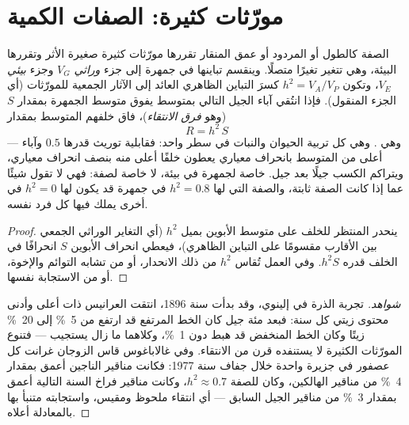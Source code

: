 \section{مورّثات كثيرة: الصفات الكمية}

\begin{theorem}\label{thm:b2:population-genetics:heritability}
الصفة كالطول أو المردود أو عمق المنقار تقررها مورّثات
كثيرة صغيرة الأثر وتقررها البيئة، وهي تتغير
تغيرًا متصلًا. وينقسم تباينها في جمهرة إلى جزء
\emph{وراثي} $V_G$ وجزء \emph{بيئي} $V_E$، وتكون
\emph{} $h^{2} = V_A/V_P$ كسرَ التباين
الظاهري العائد إلى الآثار الجمعية للمورّثات (أي الجزء
المنقول). فإذا انتُقي آباء الجيل التالي
بمتوسط يفوق متوسط الجمهرة بمقدار $S$ (وهو
\emph{فرق الانتقاء})، فاق خلفهم المتوسط بمقدار
\[
R = h^{2}\,S
\]
--- وهي \emph{}. وهي كل تربية الحيوان
والنبات في سطر واحد: فقابلية توريث قدرها $0.5$ وآباء أعلى من
المتوسط بانحراف معياري يعطون خلفًا أعلى منه بنصف انحراف
معياري، ويتراكم الكسب جيلًا بعد جيل.
 خاصة لجمهرة في
بيئة، لا خاصة لصفة: فهي لا تقول شيئًا عما إذا كانت
الصفة ثابتة، والصفة التي لها $h^{2} = 0.8$ في جمهرة قد
يكون لها $h^{2} = 0$ في أخرى يملك فيها كل فرد 
نفسه.
\end{theorem}
\begin{proof}
ينحدر  المنتظر للخلف على متوسط الأبوين
بميل $h^{2}$ (أي التغاير الوراثي الجمعي بين
الأقارب مقسومًا على التباين الظاهري)، فيعطي انحراف الأبوين $S$
انحرافًا في الخلف قدره $h^{2}S$. وفي العمل تُقاس $h^{2}$
من ذلك الانحدار، أو من تشابه التوائم
والإخوة، أو من الاستجابة نفسها.
\end{proof}
\begin{proof}[شواهد]
تجربة الذرة في إلينوي، وقد بدأت سنة 1896، انتقت العرانيس ذات
أعلى وأدنى محتوى زيتي كل سنة: فبعد مئة
جيل كان الخط المرتفع قد ارتفع من \qty{5}{\%} إلى \qty{20}{\%}
زيتًا وكان الخط المنخفض قد هبط دون \qty{1}{\%}، وكلاهما ما زال
يستجيب --- فتنوع المورّثات الكثيرة لا يستنفده
قرن من الانتقاء. وفي غالاباغوس قاس الزوجان غرانت كل
عصفور في جزيرة واحدة خلال جفاف سنة 1977: فكانت مناقير الناجين
أعمق بمقدار \qty{4}{\%} من مناقير الهالكين، وكان للصفة $h^{2}
\approx 0.7$، وكانت مناقير فراخ السنة التالية
أعمق بمقدار \qty{3}{\%} من مناقير الجيل السابق --- أي انتقاء
ملحوظ ومقيس، واستجابته متنبأ بها بالمعادلة
أعلاه.
\end{proof}

